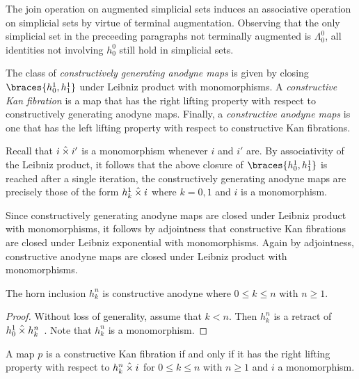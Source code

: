 \documentclass[reqno,10pt,a4paper,oneside]{amsart}
\begin{document}
The join operation on augmented simplicial sets induces an associative operation on simplicial sets by virtue of terminal augmentation.
Observing that the only simplicial set in the preceeding paragraphs not terminally augmented is $\Lambda_0^0$, all identities not involving $h_0^0$ still hold in simplicial sets.

\begin{definition}
The class of \emph{constructively generating anodyne maps} is given by closing $\braces{h_0^1, h_1^1}$ under Leibniz product with monomorphisms.
A \emph{constructive Kan fibration} is a map that has the right lifting property with respect to constructively generating anodyne maps.
Finally, a \emph{constructive anodyne maps} is one that has the left lifting property with respect to constructive Kan fibrations.
\end{definition}

Recall that $i \mathbin{\hat{\times}} i'$ is a monomorphism whenever $i$ and $i'$ are.
By associativity of the Leibniz product, it follows that the above closure of $\braces{h_0^1, h_1^1}$ is reached after a single iteration, \ie the constructively generating anodyne maps are precisely those of the form $h_k^1 \mathbin{\hat{\times}} i$ where $k = 0, 1$ and $i$ is a monomorphism.

Since constructively generating anodyne maps are closed under Leibniz product with monomorphisms, it follows by adjointness that constructive Kan fibrations are closed under Leibniz exponential with monomorphisms.
Again by adjointness, constructive anodyne maps are closed under Leibniz product with monomorphisms.

\begin{lemma}
\label{horn-constructive-anodyne}
The horn inclusion $h_k^n$ is constructive anodyne where $0 \leq k \leq n$ with $n \geq 1$.
\end{lemma}

\begin{proof}
Without loss of generality, assume that $k < n$.
Then $h_k^n$ is a retract of $h_0^1 \mathbin{\hat{\times}} h_k^n$~\cite[Proposition~2.1.2.6]{lurie:htt}.
Note that $h_k^n$ is a monomorphism.
\end{proof}

\begin{proposition}
A map $p$ is a constructive Kan fibration if and only if it has the right lifting property with respect to $h_k^n \mathbin{\hat{\times}} i$ for $0 \leq k \leq n$ with $n \geq 1$ and $i$ a monomorphism.
\end{proposition}
\end{document}
